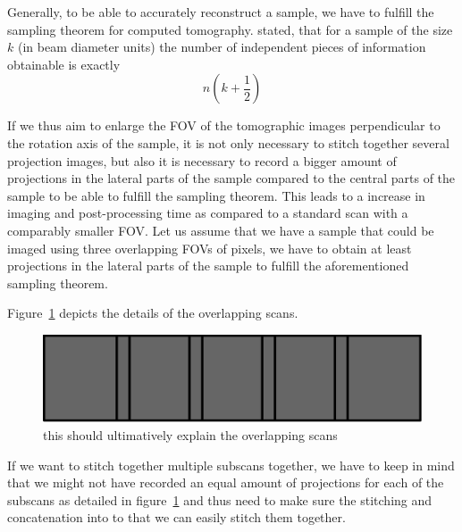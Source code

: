 Generally, to be able to accurately reconstruct a sample, we have to fulfill the sampling theorem for computed tomography. \citet{Cormack1978} stated, that for a sample of the size $k$ (in beam diameter units) the number of independent pieces of information obtainable is exactly
\begin{equation}
n(k+\frac{1}{2})%
\end{equation}

If we thus aim to enlarge the FOV of the tomographic images perpendicular to the rotation axis of the sample, it is not only necessary to stitch together several projection images, but also it is necessary to record a bigger amount of projections in the lateral parts of the sample compared to the central parts of the sample to be able to fulfill the sampling theorem. This leads to a increase in imaging and post-processing time as compared to a standard scan with a comparably smaller FOV. Let us assume that we have a sample that could be imaged using three overlapping FOVs of \unit{}{pixels}, we have to obtain at least \unit{}{projections} in the lateral parts of the sample to fulfill the aforementioned sampling theorem.

Figure~\ref{fig:overlapping scans} depicts the details of the overlapping scans.

\begin{figure}[tb]
	\centering
		\includegraphics[width=\imsize]{img/overlapping-subscans}
	\caption[Overlapping scans]{this should ultimatively explain the overlapping scans}
	\label{fig:overlapping scans}
\end{figure}

If we want to stitch together multiple subscans together, we have to keep in mind that we might not have recorded an equal amount of projections for each of the subscans as detailed in figure~\ref{fig:overlapping scans} and thus need to make sure the stitching and concatenation into to that we can easily stitch them together.

